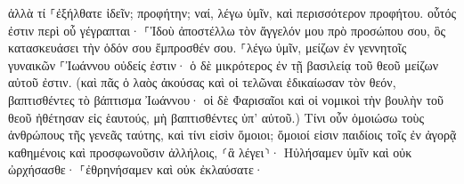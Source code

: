 \documentclass{openreader}
\begin{document}
ἀλλὰ τί ⸀ἐξήλθατε ἰδεῖν; προφήτην; ναί, λέγω ὑμῖν, καὶ περισσότερον προφήτου. 
οὗτός ἐστιν περὶ οὗ γέγραπται· ⸀Ἰδοὺ ἀποστέλλω τὸν ἄγγελόν μου πρὸ προσώπου σου, ὃς κατασκευάσει τὴν ὁδόν σου ἔμπροσθέν σου. 
⸀λέγω ὑμῖν, μείζων ἐν γεννητοῖς γυναικῶν ⸀Ἰωάννου οὐδείς ἐστιν· ὁ δὲ μικρότερος ἐν τῇ βασιλείᾳ τοῦ θεοῦ μείζων αὐτοῦ ἐστιν. 
(καὶ πᾶς ὁ λαὸς ἀκούσας καὶ οἱ τελῶναι ἐδικαίωσαν τὸν θεόν, βαπτισθέντες τὸ βάπτισμα Ἰωάννου· 
οἱ δὲ Φαρισαῖοι καὶ οἱ νομικοὶ τὴν βουλὴν τοῦ θεοῦ ἠθέτησαν εἰς ἑαυτούς, μὴ βαπτισθέντες ὑπ’ αὐτοῦ.) 
Τίνι οὖν ὁμοιώσω τοὺς ἀνθρώπους τῆς γενεᾶς ταύτης, καὶ τίνι εἰσὶν ὅμοιοι; 
ὅμοιοί εἰσιν παιδίοις τοῖς ἐν ἀγορᾷ καθημένοις καὶ προσφωνοῦσιν ἀλλήλοις, ⸂ἃ λέγει⸃· Ηὐλήσαμεν ὑμῖν καὶ οὐκ ὠρχήσασθε· ⸀ἐθρηνήσαμεν καὶ οὐκ ἐκλαύσατε· 
\end{document}
